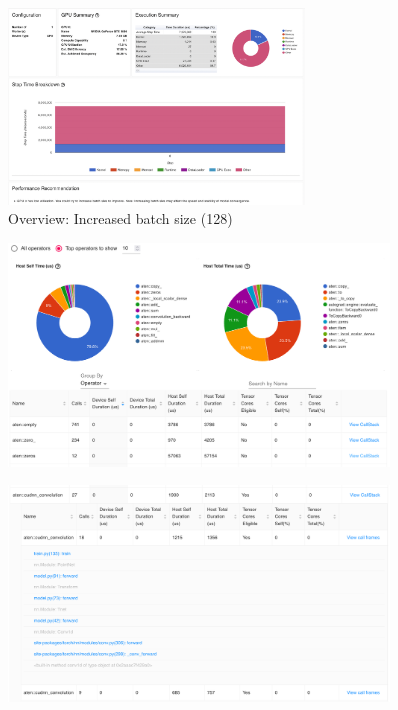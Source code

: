 \documentclass[12pt, a4paper, hidelinks]{article}
\begin{document}
\begin{figure}[H]
\centering
\includegraphics[width=0.7\textwidth]{./assets/scap_gtx1080_profiler-torch_batch-size-128_14650759}
\caption[]{Overview: Increased batch size (128)}
\label{fig:scap_gtx1080_profiler-torch_batch-size-128_14650759}
\end{figure}

\begin{figure}[H]
\centering
\includegraphics[width=0.9\textwidth]{./assets/scap_gtx1080_profiler-torch_batch-size-64_14650758_operator-view}
\caption[Operator View]{}
\label{fig:scap_gtx1080_profiler-torch_batch-size-64_14650758_operator-view}
\end{figure}

\begin{figure}[H]
\centering
\includegraphics[width=0.9\textwidth]{./assets/scap_gtx1080_profiler-torch_batch-size-64_14650758_operator-view-details}
\caption[Operator View - Details]{}
\label{fig:scap_gtx1080_profiler-torch_batch-size-64_14650758_operator-view-details}
\end{figure}
\end{document}
